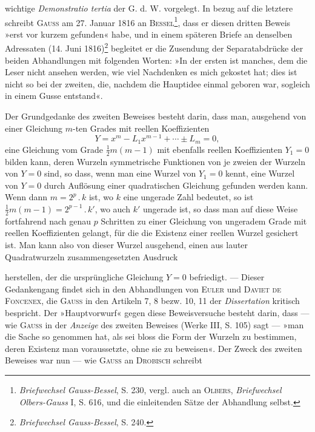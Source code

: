 wichtige \textit{Demonstratio tertia} der G. d. W. vorgelegt. In bezug auf die letztere
schreibt \textsc{Gauss} am 27. Januar 1816 an \textsc{Bessel}\footnote{\textit{Briefwechsel Gauss-Bessel}, S. 230, vergl. auch an \textsc{Olbers}, \textit{Briefwechsel Olbers-Gauss} I, S. 616, und die einleitenden Sätze der Abhandlung selbst.}, dass er diesen dritten Beweis
»erst vor kurzem gefunden« habe, und in einem späteren Briefe an denselben
Adressaten (14. Juni 1816)\footnote{\textit{Briefwechsel Gauss-Bessel}, S. 240.} begleitet er die Zusendung der Separatabdrücke
der beiden Abhandlungen mit folgenden Worten: »In der ersten ist manches,
dem die Leser nicht ansehen werden, wie viel Nachdenken es mich gekostet
hat; dies ist nicht so bei der zweiten, die, nachdem die Hauptidee einmal geboren
war, sogleich in einem Gusse entstand«.
\par
Der Grundgedanke des zweiten Beweises besteht darin, dass man, ausgehend
von einer Gleichung \(m\)-ten Grades mit reellen Koeffizienten
\[
Y=x^m-L_1x^{m-1}+\cdots\pm L_m=0,
\]
eine Gleichung vom Grade \(\tfrac12m(m-1)\) mit ebenfalls reellen Koeffizienten
\(Y_1=0\) bilden kann, deren Wurzeln symmetrische Funktionen von je zweien
der Wurzeln von \(Y=0\) sind, so dass, wenn man eine Wurzel von \(Y_1=0\)
kennt, eine Wurzel von \(Y=0\) durch Auflösung einer quadratischen Gleichung
gefunden werden kann. Wenn dann \(m=2^p\mathbin{.}k\) ist, wo \(k\) eine ungerade
Zahl bedeutet, so ist \(\tfrac12m(m-1)=2^{p-1}\mathbin{.}k'\), wo auch \(k'\) ungerade ist, so
dass man auf diese Weise fortfahrend nach genau \(p\) Schritten zu einer
Gleichung von ungeradem Grade mit reellen Koeffizienten gelangt, für die
die Existenz einer reellen Wurzel gesichert ist. Man kann also von dieser
Wurzel ausgehend, einen aus lauter Quadratwurzeln zusammengesetzten Ausdruck\par
\clearpage{}
\noindent herstellen, der die ursprüngliche Gleichung \(Y=0\) befriedigt. — Dieser
Gedankengang findet sich in den Abhandlungen von \textsc{Euler} und \textsc{Daviet de
Foncenex}, die \textsc{Gauss} in den Artikeln 7, 8 bezw. 10, 11 der \textit{Dissertation} kritisch
bespricht. Der »Hauptvorwurf« gegen diese Beweisversuche besteht
darin, dass — wie \textsc{Gauss} in der \textit{Anzeige} des zweiten Beweises (Werke III,
S. 105) sagt — »man die Sache so genommen hat, als sei bloss die Form der
Wurzeln zu bestimmen, deren Existenz man voraussetzte, ohne sie zu beweisen«.
Der Zweck des zweiten Beweises war nun — wie \textsc{Gauss} an \textsc{Drobisch} schreibt
